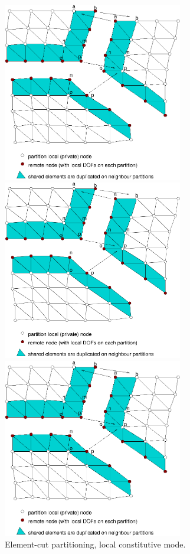 \documentclass[a4paper]{article}
\begin{document}
\begin{figure}[htb]
\begin{htmlonly}
  \centerline{\includegraphics[width=0.7\textwidth]{elementcut1.eps}}
\end{htmlonly}
\ifpdf
\centerline{\includegraphics[width=0.7\textwidth]{elementcut1.pdf}}
\else
\centerline{\includegraphics[width=0.7\textwidth]{elementcut1.eps}}
\fi
\caption{Element-cut partitioning, local constitutive mode.}
\label{elmentcut-lm}
\end{figure}
\end{document}
